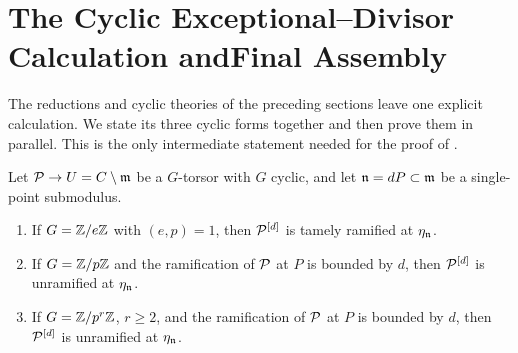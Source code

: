 \section[The Cyclic Exceptional--Divisor Calculation and Final Assembly]
{The Cyclic Exceptional--Divisor Calculation and\newline Final Assembly}

The reductions and cyclic theories of the preceding sections leave one
explicit calculation. We state its three cyclic forms together and then prove
them in parallel. This is the only intermediate statement needed for the
proof of .

\begin{theorem}
\label{theorem:cyclic_cases_after_blowup}
\label{theorem:ramification_after_blowup_P1}
\label{cor:ramification_after_blowup_is_tame}
\label{theorem:ramification_after_blowup_is_tame_for_p_power}
Let $\mathcal{P}\to U=C\setminus\mathfrak{m}$ be a $G$-torsor with $G$ cyclic, and let
$\mathfrak{n}=dP\subset\mathfrak{m}$ be a single-point submodulus.
\begin{enumerate}
    \item If $G=\mathbb{Z}/e\mathbb{Z}$ with $(e,p)=1$, then $\mathcal{P}^{[d]}$ is tamely
    ramified at $\eta_{\mathfrak{n}}$.
    \item If $G=\mathbb{Z}/p\mathbb{Z}$ and the ramification of $\mathcal{P}$ at $P$ is bounded
    by $d$, then $\mathcal{P}^{[d]}$ is unramified at $\eta_{\mathfrak{n}}$.
    \item If $G=\mathbb{Z}/p^r\mathbb{Z}$, $r\geq2$, and the ramification of $\mathcal{P}$ at
    $P$ is bounded by $d$, then $\mathcal{P}^{[d]}$ is unramified at
    $\eta_{\mathfrak{n}}$.
\end{enumerate}
\end{theorem}

